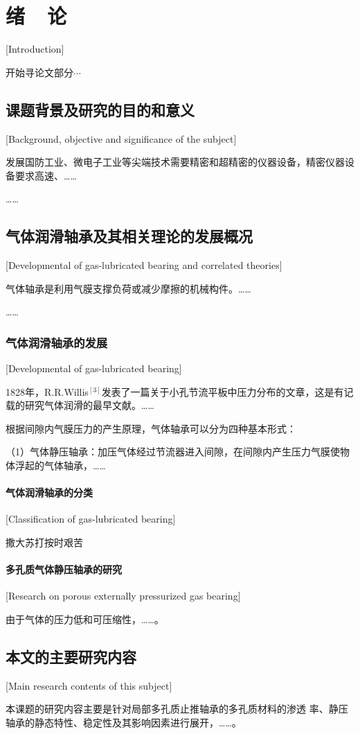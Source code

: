 
\chapter{绪~~论}[Introduction]

开始寻论文部分$\cdots$

\section{课题背景及研究的目的和意义}[Background, objective and significance of the subject]

发展国防工业、微电子工业等尖端技术需要精密和超精密的仪器设备，精密仪器设备要求高速、\dots\dots

\dots\dots

\section{气体润滑轴承及其相关理论的发展概况}[Developmental of gas-lubricated bearing and correlated theories]

气体轴承是利用气膜支撑负荷或减少摩擦的机械构件。\dots\dots

\dots\dots

\subsection{气体润滑轴承的发展}[Developmental of gas-lubricated bearing]

1828年，R.R.Willis$^{[3]}$发表了一篇关于小孔节流平板中压力分布的文章，这是有记载的研究气体润滑的最早文献。\dots\dots

根据间隙内气膜压力的产生原理，气体轴承可以分为四种基本形式：

（1）气体静压轴承：加压气体经过节流器进入间隙，在间隙内产生压力气膜使物体浮起的气体轴承，\dots\dots

\subsubsection{气体润滑轴承的分类}[Classification of gas-lubricated bearing]

撒大苏打按时艰苦

\subsubsection{多孔质气体静压轴承的研究}[Research on porous externally pressurized gas bearing]

由于气体的压力低和可压缩性，\dots\dots。

\section{本文的主要研究内容}[Main research contents of this subject]

本课题的研究内容主要是针对局部多孔质止推轴承的多孔质材料的渗透
率、静压轴承的静态特性、稳定性及其影响因素进行展开，\dots\dots。
